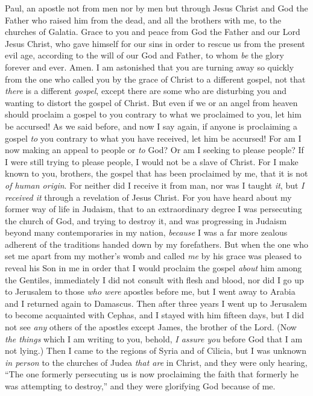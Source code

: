 
\begin{biblechapter} %
 Paul, an apostle not from men nor by men but through Jesus Christ and God the Father who raised him from the dead,
\verse and all the brothers with me, to the churches of Galatia.
\verse Grace to you and peace from God the Father and our Lord Jesus Christ,
\verse who gave himself for our sins in order to rescue us from the present evil age, according to the will of our God and Father,
\verse to whom \textit{be} the glory forever and ever. Amen.
 I am astonished that you are turning away so quickly from the one who called you by the grace of Christ to a different gospel,
\verse not that \textit{there} is a different \textit{gospel}, except there are some who are disturbing you and wanting to distort the gospel of Christ.
\verse But even if we or an angel from heaven should proclaim a gospel to you contrary to what we proclaimed to you, let him be accursed!
\verse As we said before, and now I say again, if anyone is proclaiming a gospel \textit{to} you contrary to what you have received, let him be accursed!
\verse For am I now making an appeal to people or \textit{to} God? Or am I seeking to please people? If I were still trying to please people, I would not be a slave of Christ.
 For I make known to you, brothers, the gospel that has been proclaimed by me, that it is not \textit{of human origin}.
\verse For neither did I receive it from man, nor was I taught \textit{it}, but \textit{I received it} through a revelation of Jesus Christ.
\verse For you have heard about my former way of life in Judaism, that to an extraordinary degree I was persecuting the church of God, and trying to destroy it,
\verse and was progressing in Judaism beyond many contemporaries in my nation, \textit{because} I was a far more zealous adherent of the traditions handed down by my forefathers.
\verse But when the one who set me apart from my mother’s womb and called \textit{me} by his grace was pleased
\verse to reveal his Son in me in order that I would proclaim the gospel \textit{about} him among the Gentiles, immediately I did not consult with flesh and blood,
\verse nor did I go up to Jerusalem to those \textit{who were} apostles before me, but I went away to Arabia and I returned again to Damascus.
\verse Then after three years I went up to Jerusalem to become acquainted with Cephas, and I stayed with him fifteen days,
\verse but I did not see \textit{any} others of the apostles except James, the brother of the Lord.
\verse (Now \textit{the things} which I am writing to you, behold, \textit{I assure you} before God that I am not lying.)
\verse Then I came to the regions of Syria and of Cilicia,
\verse but I was unknown \textit{in person} to the churches of Judea \textit{that are} in Christ,
\verse and they were only hearing, “The one formerly persecuting us is now proclaiming the faith that formerly he was attempting to destroy,”
\verse and they were glorifying God because of me.
\end{biblechapter}

